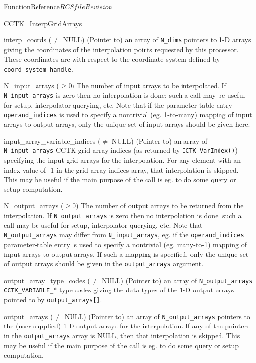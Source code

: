 \begin{cactuspart}{FunctionReference}{$RCSfile$}{$Revision$}
\begin{FunctionDescription}{CCTK\_InterpGridArrays}
\begin{ParameterSection}
\begin{Parameter}{interp\_coords ($\ne$ NULL)}
(Pointer to) an array of \verb|N_dims| pointers to 1-D arrays giving the
coordinates of the interpolation points requested by this processor.
These coordinates are with respect to the coordinate system defined by
\verb|coord_system_handle|.
\end{Parameter}
\begin{Parameter}{N\_input\_arrays ($\ge 0$)}
The number of input arrays to be interpolated.
If {\tt N\_input\_arrays} is zero then no interpolation is done; such a call
may be useful for setup, interpolator querying, etc.
Note that if the parameter table entry \verb|operand_indices| is used to specify
a nontrivial (eg. 1-to-many) mapping of input arrays to output arrays, only the
unique set of input arrays should be given here.
\end{Parameter}
\begin{Parameter}{input\_array\_variable\_indices ($\ne$ NULL)}
(Pointer to) an array of \verb|N_input_arrays| CCTK grid array indices (as
returned by \verb|CCTK_VarIndex()|) specifying the input grid arrays for the
interpolation. For any element with an index value of -1 in the grid array
indices array, that interpolation is skipped. This may be useful if the main
purpose of the call is eg. to do some query or setup computation.
\end{Parameter}
\begin{Parameter}{N\_output\_arrays ($\ge 0$)}
The number of output arrays to be returned from the interpolation.
If {\tt N\_output\_arrays} is zero then no interpolation is done; such a call
may be useful for setup, interpolator querying, etc.
Note that {\tt N\_output\_arrays} may differ from {\tt N\_input\_arrays}, eg.
if the {\tt operand\_indices} parameter-table entry is used to specify a
nontrivial (eg. many-to-1) mapping of input arrays to output arrays.
If such a mapping is specified, only the unique set of output arrays
should be given in the {\tt output\_arrays} argument.
\end{Parameter}
\begin{Parameter}{output\_array\_type\_codes ($\ne$ NULL)}
(Pointer to) an array of \verb|N_output_arrays| \verb|CCTK_VARIABLE_|*
type codes giving the data types of the 1-D output arrays pointed to by
\verb|output_arrays[]|.
\end{Parameter}
\begin{Parameter}{output\_arrays ($\ne$ NULL)}
(Pointer to) an array of \verb|N_output_arrays| pointers to the
(user-supplied) 1-D output arrays for the interpolation.
If any of the pointers in the {\tt output\_arrays} array is NULL, then that
interpolation is skipped. This may be useful if the main purpose of the call
is eg. to do some query or setup computation.
\end{Parameter}
\end{ParameterSection}


\end{FunctionDescription}
\end{cactuspart}
